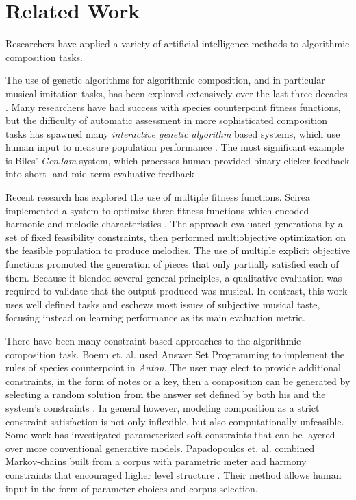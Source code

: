 \documentclass{article}
\begin{document}
	\section{Related Work}
    Researchers have applied a variety of artificial intelligence methods to algorithmic composition tasks.

    The use of genetic algorithms for algorithmic composition, and in particular musical imitation tasks, has been explored extensively over the last three decades \cite{Miranda2007}. Many researchers have had success with species counterpoint fitness functions, but the difficulty of automatic assessment in more sophisticated composition tasks has spawned many \textit{interactive genetic algorithm} based systems, which use human input to measure population performance \cite{Fernandez2013}. The most significant example is Biles' \textit{GenJam} system, which processes human provided binary clicker feedback into short- and mid-term evaluative feedback \cite{Biles94}. 
    
    Recent research has explored the use of multiple fitness functions. Scirea implemented a system to optimize three fitness functions which encoded harmonic and melodic characteristics \cite{Scirea2016}. The approach evaluated generations by a set of fixed feasibility constraints, then performed multiobjective optimization on the feasible population to produce melodies. The use of multiple explicit objective functions promoted the generation of pieces that  only  partially satisfied each of them.  Because it blended several general principles, a qualitative evaluation was required to validate that the output produced was musical. In contrast, this work uses well defined tasks and eschews most issues of subjective musical taste, focusing instead on learning performance as its main evaluation metric.

 	There have been many constraint based approaches to the algorithmic composition task. Boenn et. al. used Answer Set Programming to implement the rules of species counterpoint in \textit{Anton}. The user may elect to provide additional constraints, in the form of notes or a key, then a composition can be generated by selecting a random solution from the answer set defined by both his and the system's constraints \cite{Boenn2008}. In general however, modeling composition as a strict constraint satisfaction is not only inflexible, but also computationally unfeasible. Some work has investigated parameterized soft constraints that can be layered over more conventional generative models. Papadopoulos et. al. combined Markov-chains built from a corpus with parametric meter and harmony constraints that encouraged higher level structure \cite{Papadopoulos2016}. Their method allows human input in the form of parameter choices and corpus selection.
\end{document}
